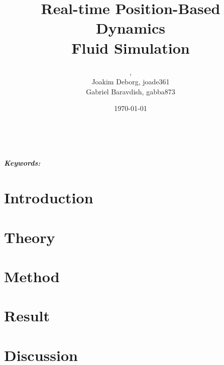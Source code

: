 \documentclass[a4paper, 11pt]{article} %
\title{\textbf{Real-time Position-Based Dynamics \\ Fluid Simulation}}
\author{\vspace{-1.2cm}{Niklas Andersson, nikan278},
\\{Joakim Deborg, joade361}
\\{Gabriel Baravdish, gabba873}}
\date{\today} %
\makeatletter
\providecommand{\keywords}[1]{\textbf{\textit{Keywords:}} #1}
\renewcommand{\maketitle}{ %
\begin{center} 
{\LARGE\@title} %

\vspace{50pt} %

{\large\@author} %
\\\@date %

\vspace{40pt} %
\end{center}
}
\makeatother
\begin{document}
\maketitle %



\vspace{-1.2cm}

\begin{abstract}

\end{abstract}

\noindent \keywords{}

\vspace{30pt} %


\newpage

\tableofcontents

\newpage

\section{Introduction}


\section{Theory}


\section{Method}


\section{Result}


\section{Discussion}



\newpage






\end{document}
